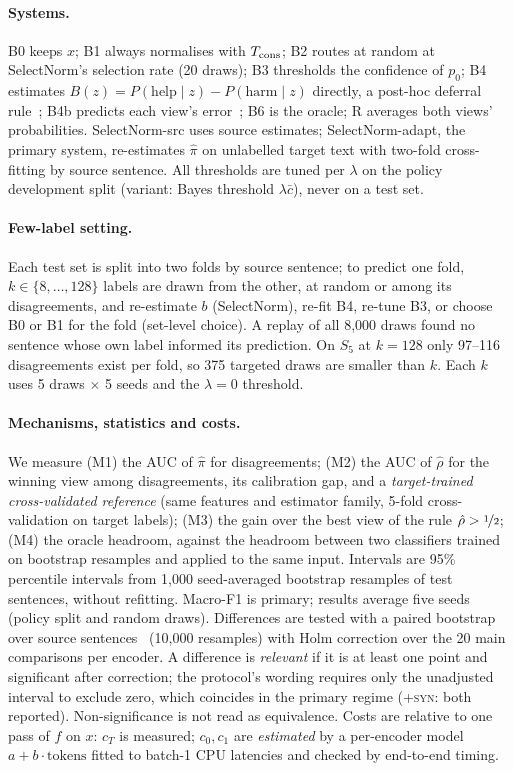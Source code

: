 \paragraph{Systems.}
B0 keeps $x$; B1 always normalises with $T_{\rm cons}$; B2 routes at random at SelectNorm's selection rate (20 draws); B3 thresholds the confidence of $p_0$; B4 estimates $B(z)=P(\text{help}\mid z)-P(\text{harm}\mid z)$ directly, a post-hoc deferral rule~\cite{jitkrittum2023cascade}; B4b predicts each view's error~\cite{kim2020learningloss}; B6 is the oracle; R averages both views' probabilities. SelectNorm-src uses source estimates; SelectNorm-adapt, the primary system, re-estimates $\hat\pi$ on unlabelled target text with two-fold cross-fitting by source sentence. All thresholds are tuned per $\lambda$ on the policy development split (variant: Bayes threshold $\lambda\bar c$), never on a test set.

\paragraph{Few-label setting.}
Each test set is split into two folds by source sentence; to predict one fold, $k\in\{8,\ldots,128\}$ labels are drawn from the other, at random or among its disagreements, and re-estimate $b$ (SelectNorm), re-fit B4, re-tune B3, or choose B0 or B1 for the fold (set-level choice). A replay of all 8{,}000 draws found no sentence whose own label informed its prediction. On $S_5$ at $k{=}128$ only 97--116 disagreements exist per fold, so 375 targeted draws are smaller than $k$. Each $k$ uses 5 draws $\times$ 5 seeds and the $\lambda=0$ threshold.

\paragraph{Mechanisms, statistics and costs.}
We measure (M1) the AUC of $\hat\pi$ for disagreements; (M2) the AUC of $\hat\rho$ for the winning view among disagreements, its calibration gap, and a \emph{target-trained cross-validated reference} (same features and estimator family, 5-fold cross-validation on target labels); (M3) the gain over the best view of the rule $\hat\rho>\nicefrac12$; (M4) the oracle headroom, against the headroom between two classifiers trained on bootstrap resamples and applied to the same input. Intervals are 95\% percentile intervals from 1{,}000 seed-averaged bootstrap resamples of test sentences, without refitting. Macro-F1 is primary; results average five seeds (policy split and random draws). Differences are tested with a paired bootstrap over source sentences~\cite{koehn2004bootstrap,dror2018hitchhiker} (10{,}000 resamples) with Holm correction over the 20 main comparisons per encoder. A difference is \emph{relevant} if it is at least one point and significant after correction; the protocol's wording requires only the unadjusted interval to exclude zero, which coincides in the primary regime (\textsc{+syn}: both reported). Non-significance is not read as equivalence. Costs are relative to one pass of $f$ on $x$: $c_T$ is measured; $c_0,c_1$ are \emph{estimated} by a per-encoder model $a+b\cdot\text{tokens}$ fitted to batch-1 CPU latencies and checked by end-to-end timing.

